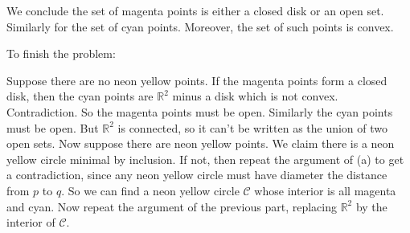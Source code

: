 \begin{problem}
\begin{sol}
		We conclude the set of magenta points is
		either a closed disk or an open set.
		Similarly for the set of cyan points.
		Moreover, the set of such points is convex.

		To finish the problem:
		\begin{itemize}
		\ii Suppose there are no neon yellow points.
		If the magenta points form a closed disk,
		then the cyan points are $\mathbb R^2$ minus a disk which is not convex.
		Contradiction. So the magenta points must be open.
		Similarly the cyan points must be open.
		But $\mathbb R^2$ is connected,
		so it can't be written as the union of two open sets.
		\ii Now suppose there are neon yellow points.
		We claim there is a neon yellow circle minimal by inclusion.
		If not, then repeat the argument of (a) to get a contradiction,
		since any neon yellow circle must have diameter the distance from $p$ to $q$.
		So we can find a neon yellow circle $\mathscr C$ whose
		interior is all magenta and cyan.
		Now repeat the argument of the previous part,
		replacing $\mathbb R^2$ by the interior of $\mathscr C$.
		 \end{itemize}
	\end{sol}
\end{problem}
